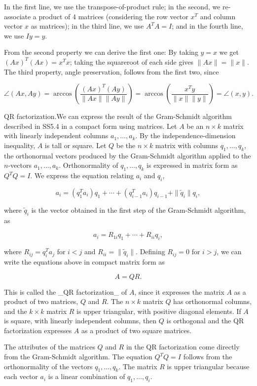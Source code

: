 In the first line, we use the transpose-of-product rule; in the second, we re-associate a product of 4 matrices (considering the row vector \(x^{T}\) and column vector \(x\) as matrices); in the third line, we use \(A^{T}A=I\); and in the fourth line, we use \(Iy=y\).

From the second property we can derive the first one: By taking \(y=x\) we get \((Ax)^{T}(Ax)=x^{T}x\); taking the squareroot of each side gives \(\|Ax\|=\|x\|\). The third property, angle preservation, follows from the first two, since

\[\angle(Ax,Ay)=\arccos\left(\frac{(Ax)^{T}(Ay)}{\|Ax\|\|Ay\|}\right)=\arccos \left(\frac{x^{T}y}{\|x\|\|y\|}\right)=\angle(x,y).\]

QR factorization.We can express the result of the Gram-Schmidt algorithm described in SS5.4 in a compact form using matrices. Let \(A\) be an \(n\times k\) matrix with linearly independent columns \(a_{1},\ldots,a_{k}\). By the independence-dimension inequality, \(A\) is tall or square. Let \(Q\) be the \(n\times k\) matrix with columns \(q_{1},\ldots,q_{k}\), the orthonormal vectors produced by the Gram-Schmidt algorithm applied to the \(n\)-vectors \(a_{1},\ldots,a_{k}\). Orthonormality of \(q_{1},\ldots,q_{k}\) is expressed in matrix form as \(Q^{T}Q=I\). We express the equation relating \(a_{i}\) and \(q_{i}\),

\[a_{i}=(q_{1}^{T}a_{i})q_{1}+\cdots+(q_{i-1}^{T}a_{i})q_{i-1}+\|\tilde{q}_{i}\| q_{i},\]

where \(\tilde{q}_{i}\) is the vector obtained in the first step of the Gram-Schmidt algorithm, as

\[a_{i}=R_{1i}q_{1}+\cdots+R_{ii}q_{i},\]

where \(R_{ij}=q_{i}^{T}a_{j}\) for \(i<j\) and \(R_{ii}=\|\tilde{q}_{i}\|\). Defining \(R_{ij}=0\) for \(i>j\), we can write the equations above in compact matrix form as

\[A=QR.\]

This is called the _QR factorization_ of \(A\), since it expresses the matrix \(A\) as a product of two matrices, \(Q\) and \(R\). The \(n\times k\) matrix \(Q\) has orthonormal columns, and the \(k\times k\) matrix \(R\) is upper triangular, with positive diagonal elements. If \(A\) is square, with linearly independent columns, then \(Q\) is orthogonal and the QR factorization expresses \(A\) as a product of two square matrices.

The attributes of the matrices \(Q\) and \(R\) in the QR factorization come directly from the Gram-Schmidt algorithm. The equation \(Q^{T}Q=I\) follows from the orthonormality of the vectors \(q_{1},\ldots,q_{k}\). The matrix \(R\) is upper triangular because each vector \(a_{i}\) is a linear combination of \(q_{1},\ldots,q_{i}\).

